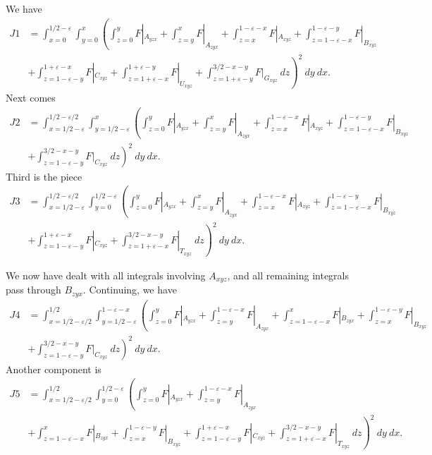 \documentclass[12pt]{amsart}
\numberwithin{equation}{section}
\theoremstyle{plain}
\theoremstyle{definition}
\begin{document}
We have
\begin{align*}
J1 & =\int_{x=0}^{1/2-\varepsilon}\int_{y=0}^{x} \left(\int_{z=0}^{y}F|_{A_{yzx}}+\int_{z=y}^{x}F|_{A_{zyx}} +\int_{z=x}^{1-\varepsilon-x}F|_{A_{xyz}} +\int_{z=1-\varepsilon-x}^{1-\varepsilon-y}F|_{B_{xyz}}  \right. \\ & \left. +\int_{z=1-\varepsilon-y}^{1+\varepsilon-x}F|_{C_{xyz}} + \int_{z=1+\varepsilon-x}^{1+\varepsilon-y}F|_{U_{xyz}} + \int_{z=1+\varepsilon-y}^{3/2-x-y}F|_{G_{xyz}}\ dz \right)^{2}\ dy\ dx.
\end{align*}
Next comes
\begin{align*}
J2 & =\int_{x=1/2-\varepsilon}^{1/2-\varepsilon/2}\int_{y=1/2-\varepsilon}^{x} \left(\int_{z=0}^{y}F|_{A_{yzx}}+\int_{z=y}^{x}F|_{A_{zyx}}+\int_{z=x}^{1-\varepsilon-x}F|_{A_{xyz}} +\int_{z=1-\varepsilon-x}^{1-\varepsilon-y}F|_{B_{xyz}}\right. \\ & \left. +\int_{z=1-\varepsilon-y}^{3/2-x-y}F|_{C_{xyz}}\ dz \right)^{2}\ dy\ dx.
\end{align*}
Third is the piece
\begin{align*}
J3 & =\int_{x=1/2-\varepsilon}^{1/2-\varepsilon/2}\int_{y=0}^{1/2-\varepsilon} \left(\int_{z=0}^{y}F|_{A_{yzx}}+\int_{z=y}^{x}F|_{A_{zyx}} +\int_{z=x}^{1-\varepsilon-x}F|_{A_{xyz}} +\int_{z=1-\varepsilon-x}^{1-\varepsilon-y}F|_{B_{xyz}} \right. \\ & \left. + \int_{z=1-\varepsilon-y}^{1+\varepsilon-x}F|_{C_{xyz}} + \int_{z=1+\varepsilon-x}^{3/2-x-y}F|_{T_{xyz}}\ dz \right)^{2}\ dy\ dx.
\end{align*}

We now have dealt with all integrals involving $A_{xyz}$, and all remaining integrals pass through $B_{zyx}$.  Continuing, we have
\begin{align*}
J4 & =\int_{x=1/2-\varepsilon/2}^{1/2}\int_{y=1/2-\varepsilon}^{1-\varepsilon-x} \left(\int_{z=0}^{y}F|_{A_{yzx}}+\int_{z=y}^{1-\varepsilon-x}F|_{A_{zyx}} +\int_{z=1-\varepsilon-x}^{x}F|_{B_{zyx}} +\int_{z=x}^{1-\varepsilon-y}F|_{B_{xyz}}\right. \\ & \left. +\int_{z=1-\varepsilon-y}^{3/2-x-y}F|_{C_{xyz}}\ dz \right)^{2}\ dy\ dx.
\end{align*}
Another component is
\begin{align*}
J5 & = \int_{x=1/2-\varepsilon/2}^{1/2}\int_{y=0}^{1/2-\varepsilon} \left(\int_{z=0}^{y}F|_{A_{yzx}}+\int_{z=y}^{1-\varepsilon-x}F|_{A_{zyx}} \right. \\ & \left. +\int_{z=1-\varepsilon-x}^{x}F|_{B_{zyx}} +\int_{z=x}^{1-\varepsilon-y}F|_{B_{xyz}} +\int_{z=1-\varepsilon-y}^{1+\varepsilon-x}F|_{C_{xyz}} + \int_{z=1+\varepsilon-x}^{3/2-x-y}F|_{T_{xyz}}\ dz \right)^{2}\ dy\ dx.
\end{align*}
\end{document}
